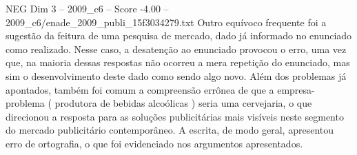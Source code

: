 \begin{textsample}{NEG Dim 3 – 2009\_c6 – Score -4.00 – 2009\_c6/enade\_2009\_publi\_15f3034279.txt}
Outro equívoco frequente foi a sugestão da feitura de uma pesquisa de mercado, dado já informado no enunciado como realizado.
Nesse caso, a desatenção ao enunciado provocou o erro, uma vez que, na maioria dessas respostas não ocorreu a mera repetição do enunciado, mas sim o desenvolvimento deste dado como sendo algo novo.
Além dos problemas já apontados, também foi comum a compreensão errônea de que a empresa-problema ( produtora de bebidas alcoólicas ) seria uma cervejaria, o que direcionou a resposta para as soluções publicitárias mais visíveis neste segmento do mercado publicitário contemporâneo.
A escrita, de modo geral, apresentou erro de ortografia, o que foi evidenciado nos argumentos apresentados.

\end{textsample}
